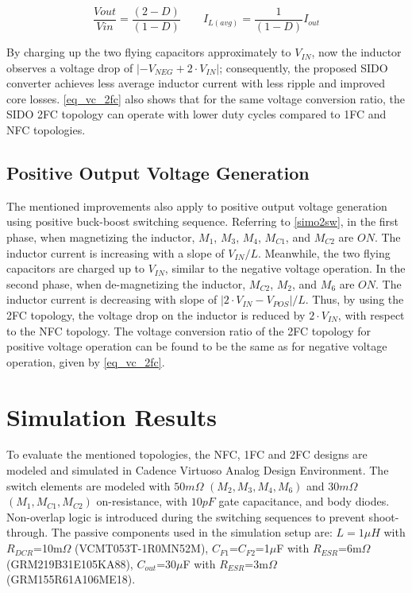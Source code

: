 \documentclass[conference,beamer]{IEEEtran}
\begin{document}
\begin{equation}
\frac{Vout}{Vin}=\frac{(2-D)}{(1-D)} \qquad  I_{\mathit{L(avg)}}=\frac{1}{(1-D)}I_{\mathit{out}}
\label{eq_vc_2fc}
\end{equation}

 By charging up the two flying capacitors approximately to $V_{IN}$, now the inductor observes a voltage drop of $|-V_{NEG}+2\cdot V_{IN}|$; consequently, the proposed SIDO converter achieves less average inductor current with less ripple and improved core losses. \autoref{eq_vc_2fc} also shows that for the same voltage conversion ratio, the SIDO 2FC topology can operate with lower duty cycles compared to 1FC and NFC topologies.
 
\subsection{Positive Output Voltage Generation}

The mentioned improvements also apply to  positive output voltage generation using positive buck-boost switching sequence. Referring to \autoref{simo2sw}, in the first phase, when magnetizing the inductor, $M_{1}$, $M_{3}$, $M_{4}$, $M_{C1}$, and $M_{C2}$ are $ON$. The inductor current is increasing with a slope of $V_{IN}/L$. Meanwhile, the two flying capacitors are charged up to $V_{IN}$, similar to the negative voltage operation. In the second phase, when de-magnetizing the inductor, $M_{C2}$, $M_{2}$, and $M_{6}$ are $ON$. The inductor current is decreasing with slope of $|2\cdot V_{IN}-V_{POS}|/L$. Thus, by using the 2FC topology, the voltage drop on the inductor is reduced by $2\cdot V_{IN}$, with respect to the NFC topology.
The voltage conversion ratio of the 2FC topology for positive voltage operation can be found to be the same as for negative voltage operation, given by \autoref{eq_vc_2fc}.

\section{Simulation Results}

To evaluate the mentioned topologies, the NFC, 1FC and 2FC designs are modeled and simulated in Cadence Virtuoso Analog Design Environment. The switch elements are modeled with $50m\Omega$ $(M_2, M_3, M_4, M_6)$ and $30m\Omega$ $(M_1, M_{C1}, M_{C2})$ on-resistance, with $10pF$ gate capacitance, and body diodes. Non-overlap logic is introduced during the switching sequences to prevent shoot-through.
The passive components used in the simulation setup are: $L=1\mu H$ with $R_{DCR}$=10m$\Omega$ (VCMT053T-1R0MN52M), $C_{F1}$=$C_{F2}$=1$\mu$F with $R_{ESR}$=6m$\Omega$ (GRM219B31E105KA88), $C_{out}$=30$\mu$F with $R_{ESR}$=3m$\Omega$ (GRM155R61A106ME18). 
\end{document}

